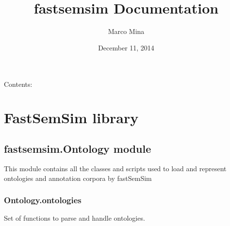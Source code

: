 \documentclass[letterpaper,10pt,english]{sphinxmanual}
\title{fastsemsim Documentation}
\date{December 11, 2014}
\author{Marco Mina}
\begin{document}
\maketitle
\tableofcontents
{}\label{index::doc}


Contents:


\chapter{FastSemSim library}
\label{fastsemsim:fastsemsim-0-9-documentation}\label{fastsemsim:fastsemsim-library}\label{fastsemsim::doc}

\section{fastsemsim.Ontology module}
\label{fastsemsim.Ontology:module-fastsemsim.Ontology}\label{fastsemsim.Ontology::doc}\label{fastsemsim.Ontology:fastsemsim-ontology-module}
This module contains all the classes and scripts used to load and represent ontologies and annotation corpora by fastSemSim


\subsection{Ontology.ontologies}
\label{fastsemsim.Ontology:ontology-ontologies}\label{fastsemsim.Ontology:module-fastsemsim.Ontology.ontologies}
Set of functions to parse and handle ontologies.
\end{document}
